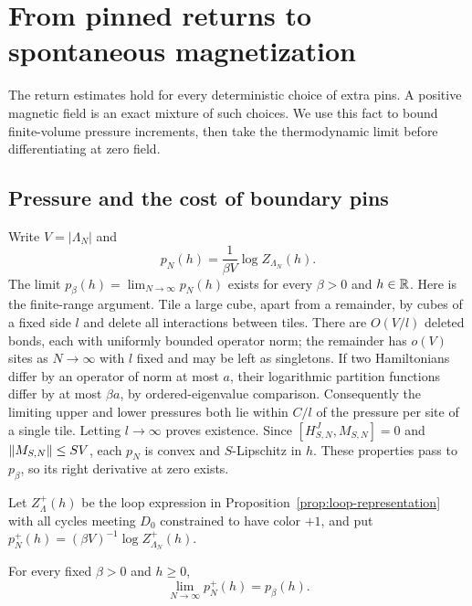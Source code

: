 \section{From pinned returns to spontaneous magnetization}
\label{sec:pressure}

The return estimates hold for every deterministic choice of extra pins.
A positive magnetic field is an exact mixture of such choices. We use
this fact to bound finite-volume pressure increments, then take the
thermodynamic limit before differentiating at zero field.

\subsection{Pressure and the cost of boundary pins}

Write $V=|\Lambda_N|$ and
\[
 p_N(h)=\frac1{\beta V}\log Z_{\Lambda_N}(h).
\]
The limit $p_\beta(h)=\lim_{N\to\infty}p_N(h)$ exists for every
$\beta>0$ and $h\in\mathbb R$. Here is the finite-range argument. Tile a large
cube, apart from a remainder, by cubes of a fixed side $l$ and delete
all interactions between tiles. There are $O(V/l)$ deleted bonds,
each with uniformly bounded operator norm; the remainder has $o(V)$
sites as $N\to\infty$ with $l$ fixed and may be left as singletons.
If two Hamiltonians differ by an operator of norm at most $a$, their
logarithmic partition functions differ by at most $\beta a$, by
ordered-eigenvalue comparison. Consequently the limiting upper and
lower pressures both lie within $C/l$ of the pressure per site of a
single tile. Letting $l\to\infty$ proves existence. Since
$[H^J_{S,N},M_{S,N}]=0$ and $\lVert M_{S,N}\rVert\le SV$, each $p_N$ is
convex and $S$-Lipschitz in $h$. These properties pass to $p_\beta$,
so its right derivative at zero exists.

Let $Z^+_\Lambda(h)$ be the loop expression in
Proposition~\ref{prop:loop-representation} with all cycles meeting
$D_0$ constrained to have color $+1$, and put
$p_N^+(h)=(\beta V)^{-1}\log Z^+_{\Lambda_N}(h)$.

\begin{proposition}
\label{prop:pressure-equivalence}
For every fixed $\beta>0$ and $h\ge0$,
\begin{equation}
 \lim_{N\to\infty}p_N^+(h)=p_\beta(h).
 \label{eq:boundary-pressure}
\end{equation}
\end{proposition}

